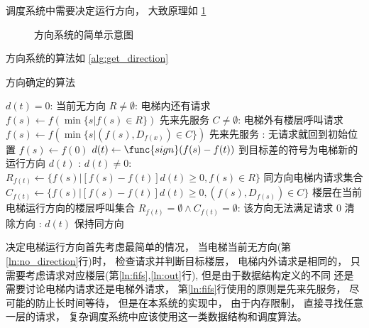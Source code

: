 \documentclass[../main.tex]{subfiles} %
\begin{document}
调度系统中需要决定运行方向，
大致原理如%
\cref{fig:direction}

\begin{figure}[H]
  \centering
  \def\svgwidth{0.6\linewidth}
  
  \caption{方向系统的简单示意图}
  \label{fig:direction}
\end{figure}

方向系统的算法如%
\cref{alg:get_direction}

\begin{algorithm}[H]
  \caption{方向确定的算法}
  \begin{codebox}
      \li \If $d(t) = 0$:
        \Comment 当前无方向 \label{ln:no_direction}
      \Then
        \li \If $R \neq \emptyset $: \Comment 电梯内还有请求
        \Then
          \li $f(s) \gets f\left(\min \{s|f(s) \in R\} \right)$ \Comment 先来先服务 \label{ln:fifs}
        \li \Else \If $C \neq \emptyset$: \Comment 电梯外有楼层呼叫请求
          \li $f(s) \gets
            f \left(\min \{s|(f(s),D_{f(x)}) \in C\} \right)$ \Comment 先来先服务 \label{ln:out}
        \li \Else: \Comment 无请求就回到初始位置 \label{ln:return}
          \li $f(s) \gets f(0)$ \label{ln:return2}
        \End
        \li $d(t) \gets \func{sign}(f(s)-f(t))$ \Comment 到目标差的符号为电梯新的运行方向
        \li \Return $d(t)$
      \End
      \li\Else: \Comment $d(t) \neq 0$:
      \Then
        \li $R_{f(t)} \gets \{f(s) | [f(s)-f(t)]d(t) \geq 0, f(s) \in R\}$ \label{ln:req_same}
          \Comment 同方向电梯内请求集合
        \li $C_{f(t)} \gets \{f(s) | [f(s)-f(t)]d(t) \geq 0, (f(s),D_{f(s)}) \in C\}$ \label{ln:call_same}
          \zi \> \Comment 楼层在当前电梯运行方向的楼层呼叫集合
        \li \If $R_{f(t)} = \emptyset \land C_{f(t)} = \emptyset$:
          \Comment 该方向无法满足请求 \label{ln:not_fit}
        \Then
          \li \Return $0$ \Comment 清除方向 \label{ln:erase}
        \li \Else:
          \li \Return $d(t)$ \Comment 保持同方向
        \End
      \End
  \end{codebox}
  \label{alg:get_direction}
\end{algorithm}

决定电梯运行方向首先考虑最简单的情况，
当电梯当前无方向(第\ref{ln:no_direction}行)时，
检查请求并判断目标楼层，
电梯内外请求是相同的，
只需要考虑请求对应楼层(第\ref{ln:fifs},\ref{ln:out}行),
但是由于数据结构定义的不同
还是需要讨论电梯内请求还是电梯外请求，
第\ref{ln:fifs}行使用的原则是先来先服务，
尽可能的防止长时间等待，
但是在本系统的实现中，
由于内存限制，
直接寻找任意一层的请求，
复杂调度系统中应该使用这一类数据结构和调度算法。
\end{document}
